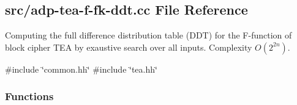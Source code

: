\hypertarget{adp-tea-f-fk-ddt_8cc}{\subsection{src/adp-\/tea-\/f-\/fk-\/ddt.cc \-File \-Reference}
\label{adp-tea-f-fk-ddt_8cc}
}


\-Computing the full difference distribution table (\-D\-D\-T) for the \-F-\/function of block cipher \-T\-E\-A by exaustive search over all inputs. \-Complexity $O(2^{2n})$.  


{\ttfamily \#include \char`\"{}common.\-hh\char`\"{}}\*
{\ttfamily \#include \char`\"{}tea.\-hh\char`\"{}}\*
\subsubsection*{\-Functions}
